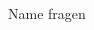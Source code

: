 \begin{discourse}{Name fragen}{}
%

\begin{tabularx}{\linewidth}{XV{3}X}
\end{tabularx}
\end{discourse}
